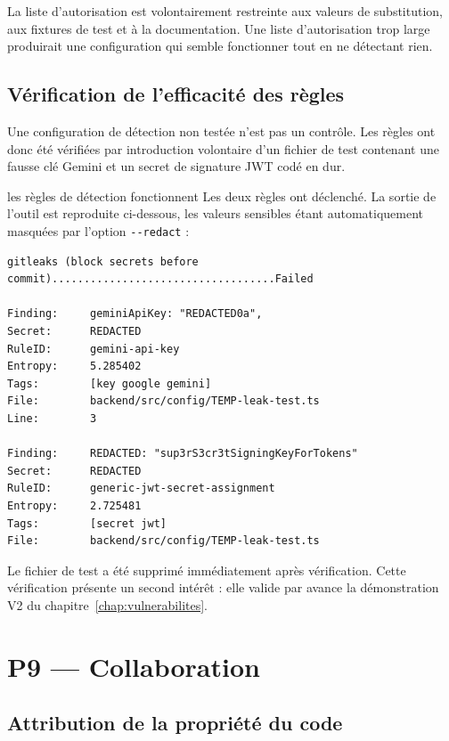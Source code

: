 La liste d'autorisation est volontairement restreinte aux valeurs de
substitution, aux fixtures de test et à la documentation. Une liste
d'autorisation trop large produirait une configuration qui semble fonctionner
tout en ne détectant rien.

\subsection{Vérification de l'efficacité des règles}

Une configuration de détection non testée n'est pas un contrôle. Les règles ont
donc été vérifiées par introduction volontaire d'un fichier de test contenant
une fausse clé Gemini et un secret de signature JWT codé en dur.

\begin{verification}{les règles de détection fonctionnent}
Les deux règles ont déclenché. La sortie de l'outil est reproduite ci-dessous,
les valeurs sensibles étant automatiquement masquées par l'option
\texttt{-{}-redact} :

\begin{lstlisting}[basicstyle=\ttfamily\tiny,numbers=none]
gitleaks (block secrets before commit)...................................Failed

Finding:     geminiApiKey: "REDACTED0a",
Secret:      REDACTED
RuleID:      gemini-api-key
Entropy:     5.285402
Tags:        [key google gemini]
File:        backend/src/config/TEMP-leak-test.ts
Line:        3

Finding:     REDACTED: "sup3rS3cr3tSigningKeyForTokens"
Secret:      REDACTED
RuleID:      generic-jwt-secret-assignment
Entropy:     2.725481
Tags:        [secret jwt]
File:        backend/src/config/TEMP-leak-test.ts
\end{lstlisting}

Le fichier de test a été supprimé immédiatement après vérification. Cette
vérification présente un second intérêt : elle valide par avance la
démonstration V2 du chapitre~\ref{chap:vulnerabilites}.
\end{verification}

\section{P9 --- Collaboration}
\label{sec:codeowners}

\subsection{Attribution de la propriété du code}

